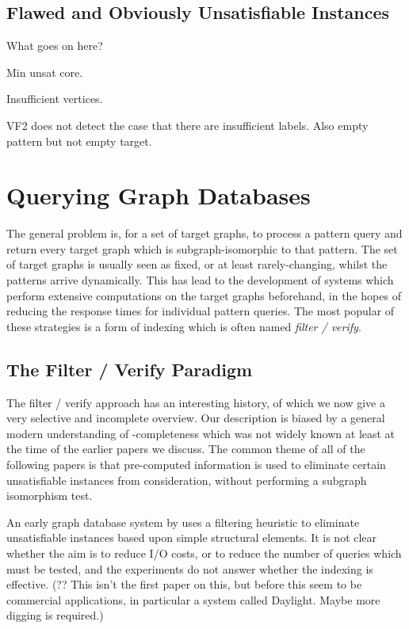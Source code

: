 \documentclass[twoside,11pt]{article}
\newcommand{\citet}[1]{\citeA{#1}}
\begin{document}
\subsection{Flawed and Obviously Unsatisfiable Instances}

What goes on here?

Min unsat core.

Insufficient vertices.

VF2 does not detect the case that there are insufficient labels. Also empty pattern but
not empty target.

\section{Querying Graph Databases}\label{section:filterverify}

The general problem is, for a set of target graphs, to process a pattern query and return every
target graph which is subgraph-isomorphic to that pattern. The set of target graphs is usually seen
as fixed, or at least rarely-changing, whilst the patterns arrive dynamically. This has lead to the
development of systems which perform extensive computations on the target graphs beforehand, in the
hopes of reducing the response times for individual pattern queries. The most popular of these
strategies is a form of indexing which is often named \emph{filter / verify}.

\subsection{The Filter / Verify Paradigm}

The filter / verify approach has an interesting history, of which we now give a very selective and
incomplete overview. Our description is biased by a general modern understanding of \NP-completeness
which was not widely known at least at the time of the earlier papers we discuss. The common theme
of all of the following papers is that pre-computed information is used to eliminate certain
unsatisfiable instances from consideration, without performing a subgraph isomorphism test.

An early graph database system by \citet{DBLP:conf/pods/ShashaWG02} uses a filtering heuristic to
eliminate unsatisfiable instances based upon simple structural elements. It is not clear whether the
aim is to reduce I/O costs, or to reduce the number of queries which must be tested, and the
experiments do not answer whether the indexing is effective. (?? This isn't the first paper on this,
but before this seem to be commercial applications, in particular a system called Daylight. Maybe
more digging is required.)
\end{document}
